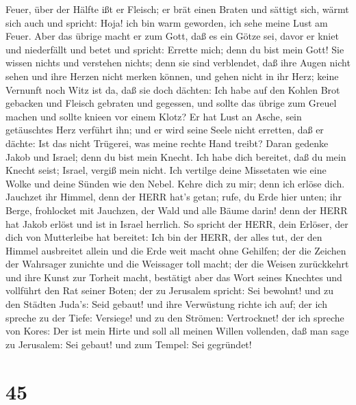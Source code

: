 Feuer, über der Hälfte ißt er Fleisch; er brät einen Braten und sättigt
sich, wärmt sich auch und spricht: Hoja! ich bin warm geworden, ich sehe
meine Lust am Feuer.  Aber das übrige macht er zum Gott,
daß es ein Götze sei, davor er kniet und niederfällt und betet und
spricht: Errette mich; denn du bist mein Gott!  Sie wissen
nichts und verstehen nichts; denn sie sind verblendet, daß ihre Augen
nicht sehen und ihre Herzen nicht merken können,  und gehen
nicht in ihr Herz; keine Vernunft noch Witz ist da, daß sie doch
dächten: Ich habe auf den Kohlen Brot gebacken und Fleisch gebraten und
gegessen, und sollte das übrige zum Greuel machen und sollte knieen vor
einem Klotz?  Er hat Lust an Asche, sein getäuschtes Herz
verführt ihn; und er wird seine Seele nicht erretten, daß er dächte: Ist
das nicht Trügerei, was meine rechte Hand treibt?  Daran
gedenke Jakob und Israel; denn du bist mein Knecht. Ich habe dich
bereitet, daß du mein Knecht seist; Israel, vergiß mein nicht.
 Ich vertilge deine Missetaten wie eine Wolke und deine
Sünden wie den Nebel. Kehre dich zu mir; denn ich erlöse dich.
 Jauchzet ihr Himmel, denn der HERR hat's getan; rufe, du
Erde hier unten; ihr Berge, frohlocket mit Jauchzen, der Wald und alle
Bäume darin! denn der HERR hat Jakob erlöst und ist in Israel herrlich.
 So spricht der HERR, dein Erlöser, der dich von
Mutterleibe hat bereitet: Ich bin der HERR, der alles tut, der den
Himmel ausbreitet allein und die Erde weit macht ohne Gehilfen;
 der die Zeichen der Wahrsager zunichte und die Weissager
toll macht; der die Weisen zurückkehrt und ihre Kunst zur Torheit macht,
 bestätigt aber das Wort seines Knechtes und vollführt den
Rat seiner Boten; der zu Jerusalem spricht: Sei bewohnt! und zu den
Städten Juda's: Seid gebaut! und ihre Verwüstung richte ich auf;
 der ich spreche zu der Tiefe: Versiege! und zu den
Strömen: Vertrocknet!  der ich spreche von Kores: Der ist
mein Hirte und soll all meinen Willen vollenden, daß man sage zu
Jerusalem: Sei gebaut! und zum Tempel: Sei gegründet!

\hypertarget{section-44}{%
\section{45}\label{section-44}}

